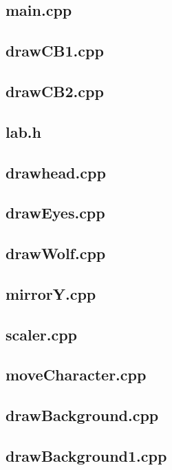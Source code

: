 \documentclass{article}
\begin{document}
\subsection{main.cpp}
\newpage\subsection{drawCB1.cpp}
\newpage\subsection{drawCB2.cpp}
\newpage\subsection{lab.h}
\newpage\subsection{drawhead.cpp}
\newpage\subsection{drawEyes.cpp}
\newpage\subsection{drawWolf.cpp}
\newpage\subsection{mirrorY.cpp}
\newpage\subsection{scaler.cpp}
\newpage\subsection{moveCharacter.cpp}
\newpage\subsection{drawBackground.cpp}
\newpage\subsection{drawBackground1.cpp}
\end{document}
